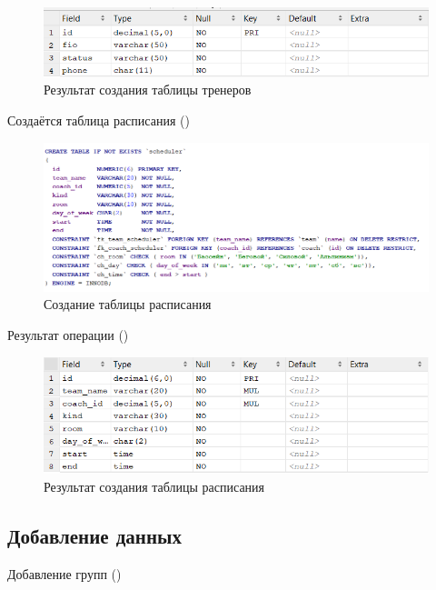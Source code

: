 \documentclass[a4paper,14pt]{article}
\begin{document}
	\begin{figure}[H]
		\centering		
		\includegraphics[width=\linewidth]{image/resCoach}
		\caption{Результат создания таблицы тренеров}\label{img:resCoach}
	\end{figure} 

	Создаётся таблица расписания ()
	
	\begin{figure}[H]
		\centering		
		\includegraphics[width=1\linewidth]{image/createScheduler.png}
		\caption{Создание таблицы расписания}\label{img:createScheduler}
	\end{figure}
	
	Результат операции ()
	
	\begin{figure}[H]
		\centering		
		\includegraphics[width=\linewidth]{image/resScheduler}
		\caption{Результат создания таблицы расписания}\label{img:resScheduler}
	\end{figure} 

\subsection{Добавление данных}

	Добавление групп ()
	
\end{document}
